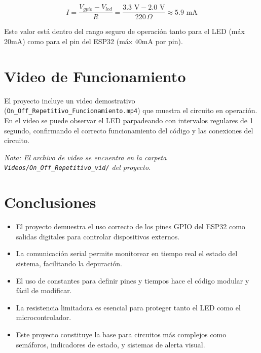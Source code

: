 \documentclass[12pt,a4paper]{article}
\begin{document}
\begin{equation}
I = \frac{V_{gpio} - V_{led}}{R} = \frac{3.3\text{ V} - 2.0\text{ V}}{220\,\Omega} \approx 5.9\text{ mA}
\end{equation}

Este valor está dentro del rango seguro de operación tanto para el LED (máx 20mA) como para el pin del ESP32 (máx 40mA por pin).

\section{Video de Funcionamiento}
El proyecto incluye un video demostrativo (\texttt{On\_Off\_Repetitivo\_Funcionamiento.mp4}) que muestra el circuito en operación. En el video se puede observar el LED parpadeando con intervalos regulares de 1 segundo, confirmando el correcto funcionamiento del código y las conexiones del circuito.

\textit{Nota: El archivo de video se encuentra en la carpeta \texttt{Videos/On\_Off\_Repetitivo\_vid/} del proyecto.}

\section{Conclusiones}
\begin{itemize}
    \item El proyecto demuestra el uso correcto de los pines GPIO del ESP32 como salidas digitales para controlar dispositivos externos.
    \item La comunicación serial permite monitorear en tiempo real el estado del sistema, facilitando la depuración.
    \item El uso de constantes para definir pines y tiempos hace el código modular y fácil de modificar.
    \item La resistencia limitadora es esencial para proteger tanto el LED como el microcontrolador.
    \item Este proyecto constituye la base para circuitos más complejos como semáforos, indicadores de estado, y sistemas de alerta visual.
\end{itemize}
\end{document}
